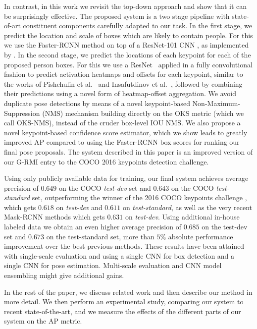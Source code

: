 \documentclass[10pt,twocolumn,letterpaper]{article}
\begin{document}
In contrast, in this work we revisit the top-down approach and show that it can be surprisingly effective. The proposed system is a two stage pipeline with state-of-art constituent components carefully adapted to our task. In the first stage, we predict the location and scale of boxes which are likely to contain people. For this we use the Faster-RCNN method \cite{Ren2015} on top of a ResNet-101 CNN \cite{He2016ResNets}, as implemented by \cite{huang2016speed}. In the second stage, we predict the locations of each keypoint for each of the proposed person boxes. For this we use a ResNet~\cite{He2016ResNets} applied in a fully convolutional fashion to predict activation heatmaps and offsets for each keypoint, similar to the works of Pishchulin et al.~\cite{deepcut} and Insafutdinov et al.~\cite{deeper_cut}, followed by combining their predictions using a novel form of heatmap-offset aggregation. We avoid duplicate pose detections by means of a novel keypoint-based Non-Maximum-Suppression (NMS) mechanism building directly on the OKS metric (which we call OKS-NMS), instead of the cruder box-level IOU NMS. We also propose a novel keypoint-based confidence score estimator, which we show leads to greatly improved AP compared to using the Faster-RCNN box scores for ranking our final pose proposals. The system described in this paper is an improved version of our G-RMI entry to the COCO 2016 keypoints detection challenge.

Using only publicly available data for training, our final system achieves average precision of $0.649$ on the COCO \emph{test-dev} set and $0.643$ on the COCO \emph{test-standard} set, outperforming the winner of the 2016 COCO keypoints challenge \cite{cmu_mscoco}, which gets $0.618$ on \emph{test-dev} and $0.611$ on \emph{test-standard}, as well as the very recent Mask-RCNN \cite{he2017mask} methods which gets $0.631$ on \emph{test-dev}. Using additional in-house labeled data we obtain an even higher average precision of $0.685$ on the test-dev set and $0.673$ on the test-standard set, more than $5\%$ absolute performance improvement over the best previous methods. These results have been attained with single-scale evaluation and using a single CNN for box detection and a single CNN for pose estimation. Multi-scale evaluation and CNN model ensembling might give additional gains.

In the rest of the paper, we discuss related work and then describe our method in more detail. We then perform an experimental study, comparing our system to recent state-of-the-art, and we measure the effects of the different parts of our system on the AP metric.
\end{document}
